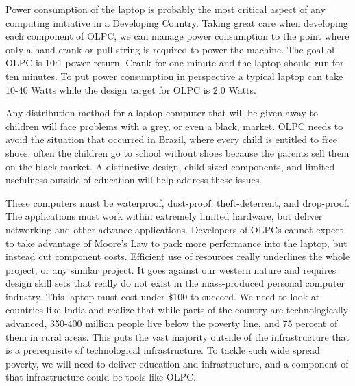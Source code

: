 \documentclass[12pt,twoside,letterpaper]{article}
\begin{document}
Power consumption of the laptop is probably the most critical aspect of any computing initiative in a Developing Country. Taking great care when developing each component of OLPC, we can manage power consumption to the point where only a hand crank or pull string is required to power the machine. The goal of OLPC is 10:1 power return. Crank for one minute and the laptop should run for ten minutes. To put power consumption in perspective a typical laptop can take 10-40 Watts while the design target for OLPC is 2.0 Watts.

Any distribution method for a laptop computer that will be given away to children will face problems with a grey, or even a black, market. OLPC needs to avoid the situation that occurred in Brazil, where every child is entitled to free shoes: often the children go to school without shoes because the parents sell them on the black market. A distinctive design, child-sized components, and limited usefulness outside of education will help address these issues.

These computers must be waterproof, dust-proof, theft-deterrent, and drop-proof. The applications must work within extremely limited hardware, but deliver networking and other advance applications. Developers of OLPCs cannot expect to take advantage of Moore's Law to pack more performance into the laptop, but instead cut component costs. Efficient use of resources really underlines the whole project, or any similar project. It goes against our western nature and requires design skill sets that really do not exist in the mass-produced personal computer industry. This laptop must cost under \$100 to succeed. We need to look at countries like India and realize that while parts of the country are technologically advanced, 350-400 million people live below the poverty line, and 75 percent of them in rural areas. This puts the vast majority outside of the infrastructure that is a prerequisite of technological infrastructure. To tackle such wide spread poverty, we will need to deliver education and infrastructure, and a component of that infrastructure could be tools like OLPC.


\end{document}
